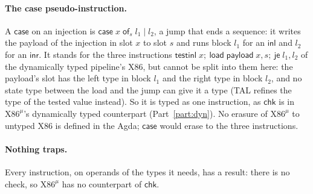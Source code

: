 \documentclass[10pt]{article}
\theoremstyle{acmplain}
\newcommand{\key}[1]{\mathsf{#1}}
\newcommand{\Ml}[1]{\textrm{#1}^{\mu}}                  %
\newcommand{\Mxcase}[4]{\key{case}\;#1\;\key{of}_{#2}\;#3 \mid #4}  %
\begin{document}
\paragraph{The case pseudo-instruction.} A $\key{case}$ on an injection
is $\Mxcase{x}{s}{l_1}{l_2}$, a jump that ends a sequence: it writes the
payload of the injection in slot $x$ to slot $s$ and runs block $l_1$ for
an $\key{inl}$ and $l_2$ for an $\key{inr}$. It stands for the three
instructions $\key{testinl}\; x;\ \key{load}\; \key{payload}\; x, s;\
\key{je}\; l_1, l_2$ of the dynamically typed pipeline's X86, but cannot
be split into them here: the payload's slot has the left type in block
$l_1$ and the right type in block $l_2$, and no state type between the
load and the jump can give it a type (TAL refines the type of the tested
value instead). So it is typed as one instruction, as $\key{chk}$ is in
$\Ml{X86}$'s dynamically typed counterpart (Part~\ref{part:dyn}). No
erasure of $\Ml{X86}$ to untyped X86 is defined in the Agda; $\key{case}$
would erase to the three instructions.

\paragraph{Nothing traps.} Every instruction, on operands of the types it
needs, has a result: there is no check, so $\Ml{X86}$ has no counterpart
of $\key{chk}$.
\end{document}
